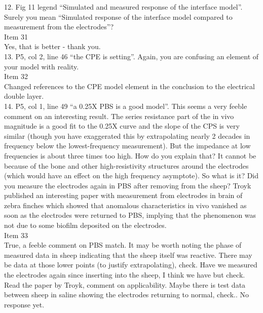 \documentclass[journal, a4paper]{IEEEtran}
\begin{document}
{12. Fig 11 legend ``Simulated and measured response of the interface model''. Surely you mean ``Simulated response of the interface model compared to measurement from the electrodes''?\\
{\color{OliveGreen}
    Item 31\\
    Yes, that is better - thank you.
}\\

13. P5, col 2, line 46 ``the CPE is setting''. Again, you are confusing an element of your model with reality.\\
{\color{OliveGreen}
    Item 32\\
    Changed references to the CPE model element in the conclusion to the electrical double layer.
}\\

14. P5, col 1, line 49 ``a 0.25X PBS is a good model''.  This seems a very feeble comment on an interesting result. The series resistance part of the in vivo magnitude is a good fit to the 0.25X curve and the slope of the CPS is very similar (though you have exaggerated this by extrapolating nearly 2 decades in frequency below the lowest-frequency measurement). But the impedance at low frequencies is about three times too high. How do you explain that? It cannot be because of the bone and other high-resistivity structures around the electrodes (which would have an effect on the high frequency asymptote). So what is it? Did you measure the electrodes again in PBS after removing from the sheep? Troyk published an interesting paper with measurement from electrodes in brain of zebra finches which showed that anomalous characteristics in vivo vanished as soon as the electrodes were returned to PBS, implying that the phenomenon was not due to some biofilm deposited on the electrodes.\\
{\color{OliveGreen}
    Item 33\\
    {\color{Red} True, a feeble comment on PBS match. It may be worth noting the phase of measured data in sheep indicating that the sheep itself was reactive. There may be data at those lower points (to justify extrapolating), check. Have we measured the electrodes again since inserting into the sheep, I think we have but check.  Read the paper by Troyk, comment on applicability. Maybe there is test data between sheep in saline showing the electrodes returning to normal, check.}.
    No response yet.
}\\
}
\end{document}
